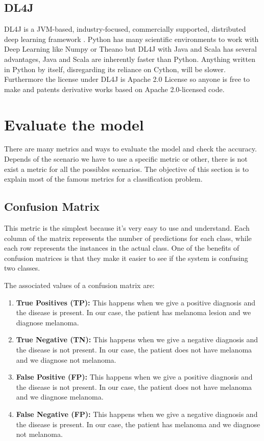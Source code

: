 \subsection[DL4J]{DL4J}
DL4J is a JVM-based, industry-focused, commercially supported, distributed deep learning framework \cite{generalcomparaison}. Python has many scientific environments to work with Deep Learning like Numpy or Theano but DL4J with Java and Scala has several advantages,
Java and Scala are inherently faster than Python. Anything written in Python by itself, disregarding its reliance on Cython, will be slower.
Furthermore the license under DL4J is Apache 2.0 License so anyone is free to make and patents derivative works based on Apache 2.0-licensed code. 

\section[Evaluate the model]{Evaluate the model}
There are many metrics and ways to evaluate the model and check the accuracy. Depends of the scenario we have to use a specific metric or other, there is not exist a metric for all the possibles scenarios. 
The objective of this section is to explain most of the famous metrics for a classification problem.

\subsection[Confusion Matrix]{Confusion Matrix}
This metric is the simplest because it's very easy to use and understand. Each column of the matrix represents the number of predictions for each class, while each row represents the instances in the actual class. One of the benefits of confusion matrices is that they make it easier to see if the system is confusing two classes.

The associated values of a confusion matrix are:

\begin{enumerate}
\item \textbf{True Positives (TP):} This happens when we give a positive diagnosis and the disease is present. In our case, the patient has melanoma lesion and we diagnose melanoma.
\item \textbf{True Negative (TN):}
This happens when we give a negative diagnosis and the disease is not present. In our case, the patient does not have melanoma and we diagnose not melanoma.
\item \textbf{False Positive (FP):} 
This happens when we give a positive diagnosis and the disease is not present. In our case, the patient does not have melanoma and we diagnose melanoma.
\item \textbf{False Negative (FP):} 
This happens when we give a negative diagnosis and the disease is present. In our case, the patient has melanoma and we diagnose not melanoma.
\end{enumerate}

